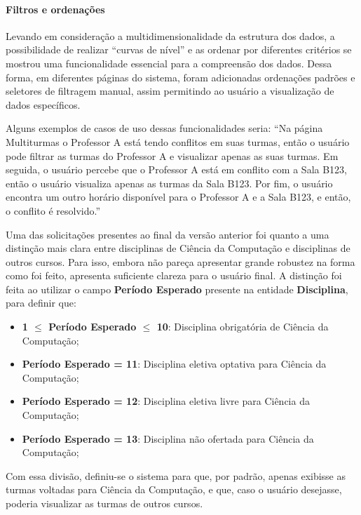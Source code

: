 \paragraph*{Filtros e ordenações}

Levando em consideração a multidimensionalidade da estrutura dos dados, a possibilidade de realizar ``curvas de nível'' e as ordenar por diferentes critérios se mostrou uma funcionalidade essencial para a compreensão dos dados. Dessa forma, em diferentes páginas do sistema, foram adicionadas ordenações padrões e seletores de filtragem manual, assim permitindo ao usuário a visualização de dados específicos.

Alguns exemplos de casos de uso dessas funcionalidades seria: ``Na página Multiturmas o Professor A está tendo conflitos em suas turmas, então o usuário pode filtrar as turmas do Professor A e visualizar apenas as suas turmas. Em seguida, o usuário percebe que o Professor A está em conflito com a Sala B123, então o usuário visualiza apenas as turmas da Sala B123. Por fim, o usuário encontra um outro horário disponível para o Professor A e a Sala B123, e então, o conflito é resolvido.''

Uma das solicitações presentes ao final da versão anterior foi quanto a uma distinção mais clara entre disciplinas de Ciência da Computação e disciplinas de outros cursos. Para isso, embora não pareça apresentar grande robustez na forma como foi feito, apresenta suficiente clareza para o usuário final. A distinção foi feita ao utilizar o campo \textbf{Período Esperado} presente na entidade \textbf{Disciplina}, para definir que:

\begin{itemize}
  \item \textbf{1 $\leq$ Período Esperado $\leq$ 10}: Disciplina obrigatória de Ciência da Computação;
  \item \textbf{Período Esperado = 11}: Disciplina eletiva optativa para Ciência da Computação;
  \item \textbf{Período Esperado = 12}: Disciplina eletiva livre para Ciência da Computação;
  \item \textbf{Período Esperado = 13}: Disciplina não ofertada para Ciência da Computação;
\end{itemize}

Com essa divisão, definiu-se o sistema para que, por padrão, apenas exibisse as turmas voltadas para Ciência da Computação, e que, caso o usuário desejasse, poderia visualizar as turmas de outros cursos.

